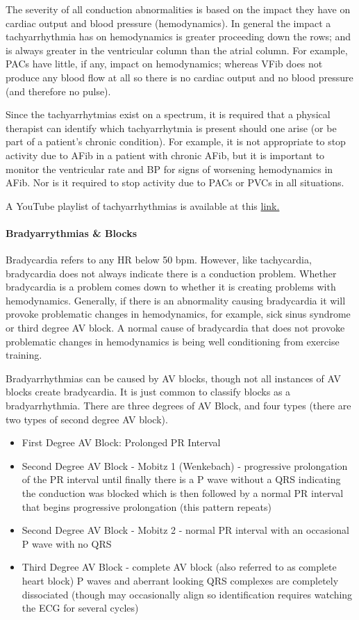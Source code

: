 The severity of all conduction abnormalities is based on the impact they have on cardiac output and blood pressure (hemodynamics). In general the impact a tachyarrhythmia has on hemodynamics is greater proceeding down the rows; and is always greater in the ventricular column than the atrial column. For example, PACs have little, if any, impact on hemodynamics; whereas VFib does not produce any blood flow at all so there is no cardiac output and no blood pressure (and therefore no pulse). 

Since the tachyarrhytmias exist on a spectrum, it is required that a physical therapist can identify which tachyarrhytmia is present should one arise (or be part of a patient's chronic condition). For example, it is not appropriate to stop activity due to AFib in a patient with chronic AFib, but it is important to monitor the ventricular rate and BP for signs of worsening hemodynamics in AFib. Nor is it required to stop activity due to PACs or PVCs in all situations. 

A YouTube playlist of tachyarrhythmias is available at this \href{https://www.youtube.com/playlist?list=PLNN6HI4OXQmwFdE8LVIGC_l5WG2ViWAy3}{link.}

\paragraph{Bradyarrythmias \& Blocks}

Bradycardia refers to any HR below 50 bpm. However, like tachycardia, bradycardia does not always indicate there is a conduction problem. Whether bradycardia is a problem comes down to whether it is creating problems with hemodynamics. Generally, if there is an abnormality causing bradycardia it will provoke problematic changes in hemodynamics, for example, sick sinus syndrome or third degree AV block. A normal cause of bradycardia that does not provoke problematic changes in hemodynamics is being well conditioning from exercise training.

Bradyarrhythmias can be caused by AV blocks, though not all instances of AV blocks create bradycardia. It is just common to classify blocks as a bradyarrhythmia. There are three degrees of AV Block, and four types (there are two types of second degree AV block).

\begin{itemize}
    \item First Degree AV Block: Prolonged PR Interval
    \item Second Degree AV Block - Mobitz 1 (Wenkebach) - progressive prolongation of the PR interval until finally there is a P wave without a QRS indicating the conduction was blocked which is then followed by a normal PR interval that begins progressive prolongation (this pattern repeats)
    \item Second Degree AV Block - Mobitz 2 - normal PR interval with an occasional P wave with no QRS
    \item Third Degree AV Block - complete AV block (also referred to as complete heart block) P waves and aberrant looking QRS complexes are completely dissociated (though may occasionally align so identification requires watching the ECG for several cycles)
\end{itemize}

